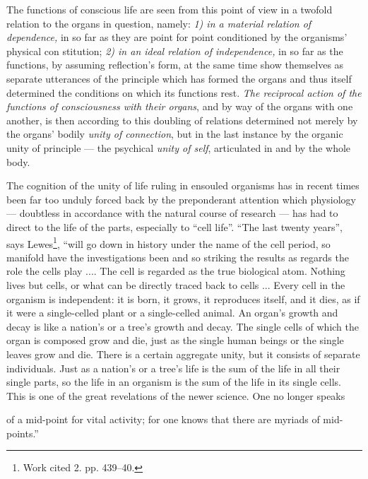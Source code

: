 \documentclass[12pt,a4paper]{book}
\begin{document}
The functions of conscious life are seen from this point of view in a twofold
relation to the organs in question, namely: \emph{1) in a material relation of
dependence,} in so far as they are point for point conditioned by the organisms'
physical con%
\setcounter{footnote}{0}%
stitution; \emph{2) in an ideal relation of independence,} in so far as the
functions, by assuming reflection's form, at the same time show themselves as
separate utterances of the principle which has formed the organs and thus itself
determined the conditions on which its functions rest. \emph{The reciprocal action
of the functions of consciousness with their organs}, and by way of the organs with
one another, is then according to this doubling of relations determined not merely
by the organs' bodily \emph{unity of connection}, but in the last instance by the
organic unity of principle --- the psychical \emph{unity of self}, articulated in
and by the whole body.

The cognition of the unity of life ruling in ensouled organisms has in recent times
been far too unduly forced back by the preponderant attention which physiology ---
doubtless in accordance with the natural course of research --- has had to direct
to the life of the parts, especially to ``cell life''. ``The last twenty years'',
says Lewes\footnote{Work cited 2. pp. 439--40.}, ``will go down in history under
the name of the cell period, so manifold have the investigations been and so
striking the results as regards the role the cells play .... The cell is regarded
as the true biological atom. Nothing lives but cells, or what can be directly
traced back to cells ... Every cell in the organism is independent: it is born, it
grows, it reproduces itself, and it dies, as if it were a single-celled plant or a
single-celled animal. An organ's growth and decay is like a nation's or a tree's
growth and decay. The single cells of which the organ is composed grow and die,
just as the single human beings or the single leaves grow and die. There is a
certain aggregate unity, but it consists of separate individuals. Just as a
nation's or a tree's life is the sum of the life in all their single parts, so the
life in an organism is the sum of the life in its single cells. This is one of the
great revelations of the newer science. One no longer speaks

of a mid-point for vital activity; for one knows that there are myriads of
mid-points.''
\end{document}
